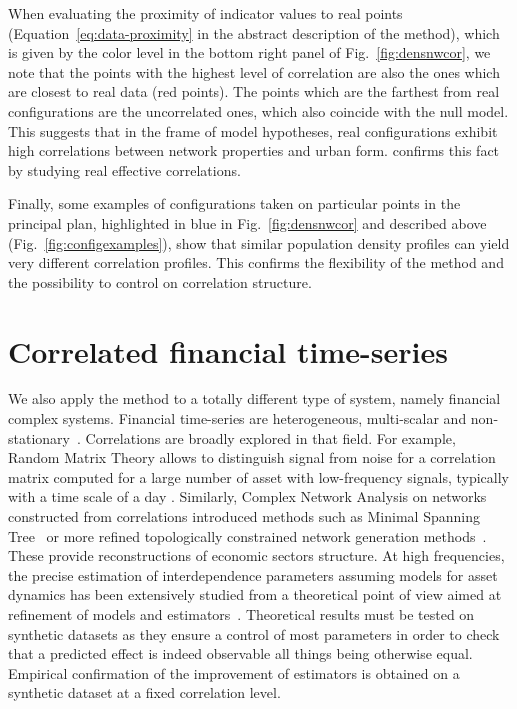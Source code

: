 \documentclass{article}
\begin{document}
When evaluating the proximity of indicator values to real points (Equation~\ref{eq:data-proximity} in the abstract description of the method), which is given by the color level in the bottom right panel of Fig.~\ref{fig:densnwcor}, we note that the points with the highest level of correlation are also the ones which are closest to real data (red points). The points which are the farthest from real configurations are the uncorrelated ones, which also coincide with the null model. This suggests that in the frame of model hypotheses, real configurations exhibit high correlations between network properties and urban form. \cite{raimbault2019urban} confirms this fact by studying real effective correlations.

Finally, some examples of configurations taken on particular points in the principal plan, highlighted in blue in Fig.~\ref{fig:densnwcor} and described above (Fig.~\ref{fig:configexamples}), show that similar population density profiles can yield very different correlation profiles. This confirms the flexibility of the method and the possibility to control on correlation structure.





\section*{Correlated financial time-series}



We also apply the method to a totally different type of system, namely financial complex systems. Financial time-series are heterogeneous, multi-scalar and non-stationary~\cite{mantegna2000introduction}. Correlations are broadly explored in that field. For example, Random Matrix Theory allows to distinguish signal from noise for a correlation matrix computed for a large number of asset with low-frequency signals, typically with a time scale of a day \cite{2009arXiv0910.1205B}. Similarly, Complex Network Analysis on networks constructed from correlations introduced methods such as Minimal Spanning Tree~\cite{2001PhyA..299...16B} or more refined topologically constrained network generation methods~\cite{tumminello2005tool}. These provide reconstructions of economic sectors structure. At high frequencies, the precise estimation of interdependence parameters assuming models for asset dynamics has been extensively studied from a theoretical point of view aimed at refinement of models and estimators~\cite{barndorff2011multivariate}. Theoretical results must be tested on synthetic datasets as they ensure a control of most parameters in order to check that a predicted effect is indeed observable all things being otherwise equal. Empirical confirmation of the improvement of estimators is obtained on a synthetic dataset at a fixed correlation level.
\end{document}
